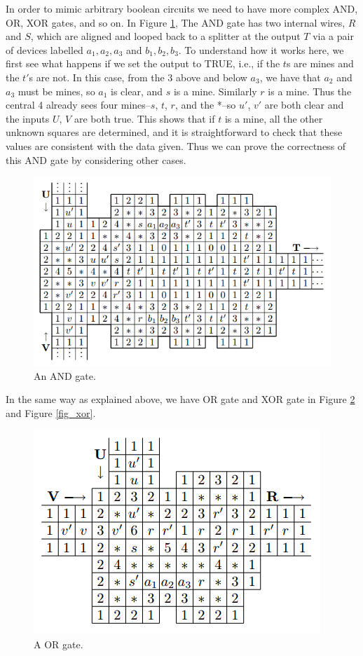\documentclass{article}
\begin{document}
In order to mimic arbitrary boolean circuits we need to have more complex AND, OR, XOR gates, and so on. In Figure \ref{fig_and}, The AND gate has two internal wires, $R$ and $S$, which are aligned and looped back to a splitter at the output $T$ via a pair of devices labelled $a_1,a_2,a_3$ and $b_1,b_2,b_3$. To understand how it works here, we first see what happens if we set the output to TRUE, i.e., if the $t$s are mines and the $t'$s are not. In this case, from the 3 above and below $a_3$, we have that $a_2$ and $a_3$ must be mines, so $a_1$ is clear, and $s$ is a mine. Similarly $r$ is a mine. Thus the central 4 already sees four mines--$s$, $t$, $r$, and the *--so $u'$, $v'$ are both clear and the inputs $U$, $V$ are both true. This shows that if $t$ is a mine, all the other unknown squares are determined, and it is straightforward to check that these
values are consistent with the data given. Thus we can prove the correctness of this AND gate by considering other cases.

\begin{figure}[H]
  \centering
  \includegraphics[scale=.9]{images/and.png}
  \caption{An AND gate.}
  \label{fig_and}
\end{figure}

In the same way as explained above, we have OR gate and XOR gate in Figure \ref{fig_or} and Figure \ref{fig_xor}.

\begin{figure}[H]
  \centering
  \includegraphics[scale=.9]{images/or.png}
  \caption{A OR gate.}
  \label{fig_or}
\end{figure}
\end{document}
